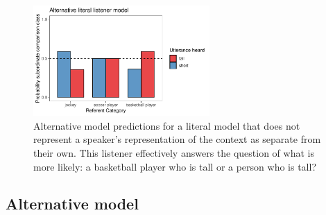 \documentclass[doc]{apa6}
\begin{document}
\begin{figure}
\centering
\includegraphics[width=0.6\textwidth]{figs/cc_inference_L0.pdf}
\caption{\small \label{fig:alternativeModelPredictions}Alternative model predictions for a literal model that does not represent a speaker's representation of the context as separate from their own. This listener effectively answers the question of what is more likely: a basketball player who is tall or a person who is tall?
}
\end{figure}

\subsection{Alternative model}
\end{document}
